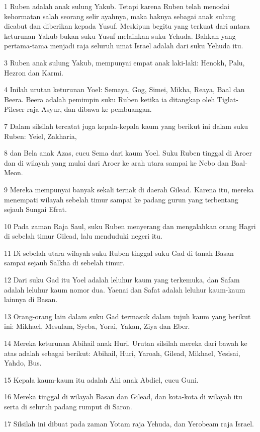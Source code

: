 \par 1 Ruben adalah anak sulung Yakub. Tetapi karena Ruben telah menodai kehormatan salah seorang selir ayahnya, maka haknya sebagai anak sulung dicabut dan diberikan kepada Yusuf. Meskipun begitu yang terkuat dari antara keturunan Yakub bukan suku Yusuf melainkan suku Yehuda. Bahkan yang pertama-tama menjadi raja seluruh umat Israel adalah dari suku Yehuda itu.
\par 3 Ruben anak sulung Yakub, mempunyai empat anak laki-laki: Henokh, Palu, Hezron dan Karmi.
\par 4 Inilah urutan keturunan Yoel: Semaya, Gog, Simei, Mikha, Reaya, Baal dan Beera. Beera adalah pemimpin suku Ruben ketika ia ditangkap oleh Tiglat-Pileser raja Asyur, dan dibawa ke pembuangan.
\par 7 Dalam silsilah tercatat juga kepala-kepala kaum yang berikut ini dalam suku Ruben: Yeiel, Zakharia,
\par 8 dan Bela anak Azas, cucu Sema dari kaum Yoel. Suku Ruben tinggal di Aroer dan di wilayah yang mulai dari Aroer ke arah utara sampai ke Nebo dan Baal-Meon.
\par 9 Mereka mempunyai banyak sekali ternak di daerah Gilead. Karena itu, mereka menempati wilayah sebelah timur sampai ke padang gurun yang terbentang sejauh Sungai Efrat.
\par 10 Pada zaman Raja Saul, suku Ruben menyerang dan mengalahkan orang Hagri di sebelah timur Gilead, lalu menduduki negeri itu.
\par 11 Di sebelah utara wilayah suku Ruben tinggal suku Gad di tanah Basan sampai sejauh Salkha di sebelah timur.
\par 12 Dari suku Gad itu Yoel adalah leluhur kaum yang terkemuka, dan Safam adalah leluhur kaum nomor dua. Yaenai dan Safat adalah leluhur kaum-kaum lainnya di Basan.
\par 13 Orang-orang lain dalam suku Gad termasuk dalam tujuh kaum yang berikut ini: Mikhael, Mesulam, Syeba, Yorai, Yakan, Ziya dan Eber.
\par 14 Mereka keturunan Abihail anak Huri. Urutan silsilah mereka dari bawah ke atas adalah sebagai berikut: Abihail, Huri, Yaroah, Gilead, Mikhael, Yesisai, Yahdo, Bus.
\par 15 Kepala kaum-kaum itu adalah Ahi anak Abdiel, cucu Guni.
\par 16 Mereka tinggal di wilayah Basan dan Gilead, dan kota-kota di wilayah itu serta di seluruh padang rumput di Saron.
\par 17 Silsilah ini dibuat pada zaman Yotam raja Yehuda, dan Yerobeam raja Israel.
